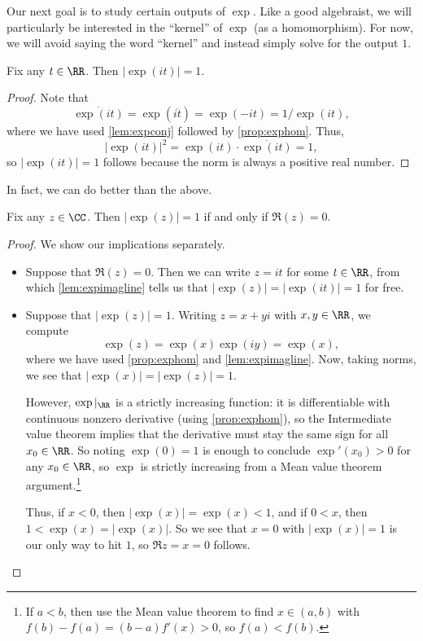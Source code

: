 Our next goal is to study certain outputs of $\exp$. Like a good algebraist, we will particularly be interested in the ``kernel'' of $\exp$ (as a homomorphism). For now, we will avoid saying the word ``kernel'' and instead simply solve for the output $1$.
\begin{lemma} \label{lem:expimagline}
	Fix any $t\in\RR$. Then $|\exp(it)|=1$.
\end{lemma}
\begin{proof}
	Note that
	\[\overline{\exp(it)}=\exp(\overline{it})=\exp(-it)=1/\exp(it),\]
	where we have used \autoref{lem:expconj} followed by \autoref{prop:exphom}. Thus,
	\[|\exp(it)|^2=\exp(it)\cdot\overline{\exp(it)}=1,\]
	so $|\exp(it)|=1$ follows because the norm is always a positive real number.
\end{proof}
In fact, we can do better than the above.
\begin{corollary} \label{cor:expmagker}
	Fix any $z\in\CC$. Then $|\exp(z)|=1$ if and only if $\Re(z)=0$.
\end{corollary}
\begin{proof}
	We show our implications separately.
	\begin{itemize}
		\item Suppose that $\Re(z)=0$. Then we can write $z=it$ for some $t\in\RR$, from which \autoref{lem:expimagline} tells us that $|\exp(z)|=|\exp(it)|=1$ for free.
		\item Suppose that $|\exp(z)|=1$. Writing $z=x+yi$ with $x,y\in\RR$, we compute
		\[\exp(z)=\exp(x)\exp(iy)=\exp(x),\]
		where we have used \autoref{prop:exphom} and \autoref{lem:expimagline}. Now, taking norms, we see that $|\exp(x)|=|\exp(z)|=1$.
		
		However, $\exp|_\RR$ is a strictly increasing function: it is differentiable with continuous nonzero derivative (using \autoref{prop:exphom}), so the Intermediate value theorem implies that the derivative must stay the same sign for all $x_0\in\RR$. So noting $\exp(0)=1$ is enough to conclude $\exp'(x_0)>0$ for any $x_0\in\RR$, so $\exp$ is strictly increasing from a Mean value theorem argument.\footnote{If $a<b$, then use the Mean value theorem to find $x\in(a,b)$ with $f(b)-f(a)=(b-a)f'(x)>0$, so $f(a)<f(b)$.}

		Thus, if $x<0$, then $|\exp(x)|=\exp(x)<1$, and if $0<x$, then $1<\exp(x)=|\exp(x)|$. So we see that $x=0$ with $|\exp(x)|=1$ is our only way to hit $1$, so $\Re z=x=0$ follows.
		\qedhere
	\end{itemize}
\end{proof}
